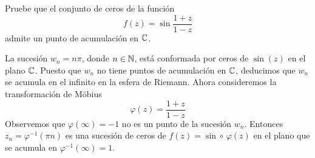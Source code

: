 \begin{exercise}
Pruebe que el conjunto de ceros de la función
$$f(z) = \sin \frac {1+z} {1-z}$$
admite un punto de acumulación en $\mathbb C$.
\end{exercise}

\begin{solution}
La sucesión $w_n = n\pi$, donde $n \in \mathbb N$, está conformada por ceros de $\sin(z)$ en el plano $\mathbb C$. Puesto que $w_n$ no tiene puntos de acumulación en $\mathbb C$, deducimos que $w_n$ se acumula en el infinito en la esfera de Riemann. Ahora consideremos la transformación de Möbius
$$\varphi(z) = \frac {1+z} {1-z}$$
Observemos que $\varphi(\infty) = -1$ no es un punto de la sucesión $w_n$. Entonces $z_n = \varphi^{-1}(\pi n)$ es una sucesión de ceros de $f(z) = \sin \circ \, \varphi(z)$ en el plano que se acumula en $\varphi^{-1}(\infty) = 1$.
\end{solution}
